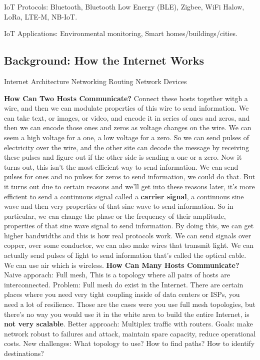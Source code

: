 \documentclass[11 pt]{scrartcl}
\begin{document}
    \ii IoT Protocols: Bluetooth, Bluetooth Low Energy (BLE), Zigbee, WiFi Halow, LoRa, LTE-M, NB-IoT. 

    \ii IoT Applications: Environmental monitoring, Smart homes/buildings/cities.
\itemend
\subsection{Background: How the Internet Works}
\begin{enumerate}
    \ii Internet Architecture
    \ii Networking Routing
    \ii Network Devices
\end{enumerate}
\textbf{How Can Two Hosts Communicate?}\newline
Connect these hosts together witgh a wire, and then we can modulate properties of this wire to send information. We can take text, or images, or video, and encode it in series of ones and zeros, and then we can encode those ones and zeros as voltage changes on the wire. We can seem a high voltage for a one, a low voltage for a zero. So we can send pulses of electricity over the wire, and the other site can decode the message by receiving these pulses and figure out if the other side is sending a one or a zero.  Now it turns out, this isn't the most efficient way to send information. We can send pulses for ones and no pulses for zeros to send information, we could do that. But it turns out due to certain reasons and we'll get into these reasons later, it's more efficient to send a continuous signal called a \textbf{carrier signal}, a continuous sine wave and then very properties of that sine wave to send information. So in particular, we can change the phase or the frequency of their amplitude, properties of that sine wave signal to send information. By doing this, we can get higher bandwidths and this is how real protocols work. We can send signals over copper, over some conductor, we can also make wires that transmit light. We can actually send pulses of light to send information that's called the optical cable. We can use air which is wireless.\newline
\textbf{How Can Many Hosts Communicate?}\newline
Naive apporach: Full mesh, This is a topology where all pairs of hosts are interconnected. Problem: Full mesh do exist in the Internet. There are certain places where you need very tight coupling inside of data centers or ISPs, you need a lot of resilience. Those are the cases were you use full mesh topologies, but there's no way you would use it in the white area to build the entire Internet, is \textbf{not very scalable}. Better approach: Multiplex traffic with routers. Goals: make network robust to failures and attack, maintain spare capacity, reduce operational costs. New challenges: What topology to use? How to find paths? How to identify destinations? 
\end{document}
